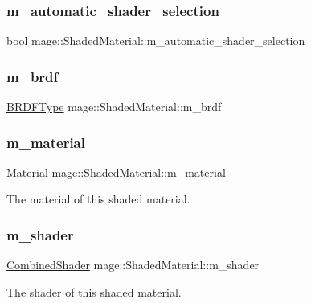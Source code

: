 \subsubsection{\texorpdfstring{m\+\_\+automatic\+\_\+shader\+\_\+selection}{m\_automatic\_shader\_selection}}
{\footnotesize\ttfamily bool mage\+::\+Shaded\+Material\+::m\+\_\+automatic\+\_\+shader\+\_\+selection\hspace{0.3cm}{\ttfamily [private]}}

\hypertarget{structmage_1_1_shaded_material_a59a4b0ecb6ab1d60a285e0f1f69b5e36}{}\label{structmage_1_1_shaded_material_a59a4b0ecb6ab1d60a285e0f1f69b5e36} 
\subsubsection{\texorpdfstring{m\+\_\+brdf}{m\_brdf}}
{\footnotesize\ttfamily \hyperlink{namespacemage_ae7a7a03a7b34d7e2689689bb8295cd38}{B\+R\+D\+F\+Type} mage\+::\+Shaded\+Material\+::m\+\_\+brdf\hspace{0.3cm}{\ttfamily [private]}}

\hypertarget{structmage_1_1_shaded_material_a319e1ca2103c50f84ce0605b08bd34b4}{}\label{structmage_1_1_shaded_material_a319e1ca2103c50f84ce0605b08bd34b4} 
\subsubsection{\texorpdfstring{m\+\_\+material}{m\_material}}
{\footnotesize\ttfamily \hyperlink{structmage_1_1_material}{Material} mage\+::\+Shaded\+Material\+::m\+\_\+material\hspace{0.3cm}{\ttfamily [private]}}

The material of this shaded material. \hypertarget{structmage_1_1_shaded_material_a712d07ac1995ff592bbb8ab20a294270}{}\label{structmage_1_1_shaded_material_a712d07ac1995ff592bbb8ab20a294270} 
\subsubsection{\texorpdfstring{m\+\_\+shader}{m\_shader}}
{\footnotesize\ttfamily \hyperlink{structmage_1_1_combined_shader}{Combined\+Shader} mage\+::\+Shaded\+Material\+::m\+\_\+shader\hspace{0.3cm}{\ttfamily [private]}}

The shader of this shaded material. 